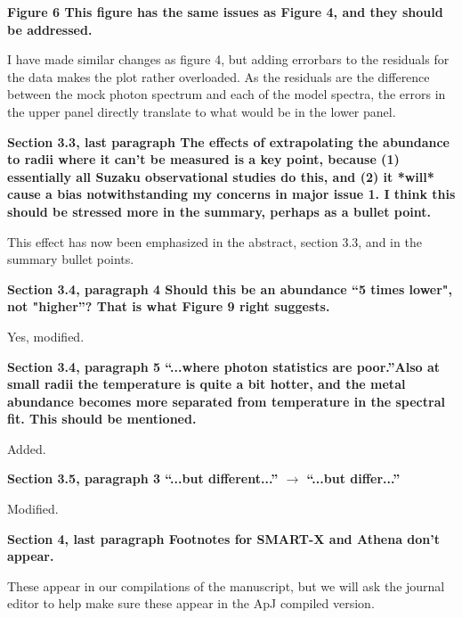 \documentclass{article}
\begin{document}
{\bf 
Figure 6
This figure has the same issues as Figure 4, and they should be addressed.
}

I have made similar changes as figure 4, but adding errorbars to the
residuals for the data makes the plot rather overloaded.  As the residuals
are the difference between the mock photon spectrum and each of the
model spectra, the errors in the upper panel directly translate to
what would be in the lower panel.  

{\bf 
Section 3.3, last paragraph
The effects of extrapolating the abundance to radii where it can't be
measured is a key point, because (1) essentially all Suzaku observational
studies do this, and (2) it *will* cause a bias notwithstanding my concerns
in major issue 1. I think this should be stressed more in the summary,
perhaps as a bullet point.
}

This effect has now been emphasized in the abstract, section 3.3, and
in the summary bullet points.

{\bf 
Section 3.4, paragraph 4
Should this be an abundance ``5 times lower", not "higher''? That is what
Figure 9 right suggests.
}

Yes, modified.

{\bf 
Section 3.4, paragraph 5
``...where photon statistics are poor.''Also at small radii the temperature
is quite a bit hotter, and the metal abundance becomes more separated from
temperature in the spectral fit. This should be mentioned.
}

Added.

{\bf 
Section 3.5, paragraph 3
``...but different...'' $\rightarrow$ ``...but differ...''
}

Modified.

{\bf 
Section 4, last paragraph
Footnotes for SMART-X and Athena don't appear.
}

These appear in our compilations of the manuscript, but we will ask
the journal editor to help make sure these appear in the ApJ compiled version.
\end{document}
